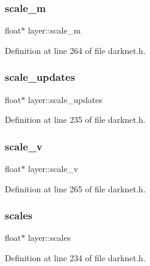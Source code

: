 \mbox{\label{structlayer_a858dcb301c88b816430a797dce3b95b6}} 
\subsubsection{\texorpdfstring{scale\_m}{scale\_m}}
{\footnotesize\ttfamily float$\ast$ layer\+::scale\+\_\+m}



Definition at line 264 of file darknet.\+h.

\mbox{\label{structlayer_afe8abd57f459714570b99b521cf9e159}} 
\subsubsection{\texorpdfstring{scale\_updates}{scale\_updates}}
{\footnotesize\ttfamily float$\ast$ layer\+::scale\+\_\+updates}



Definition at line 235 of file darknet.\+h.

\mbox{\label{structlayer_a881162ac744dcf116ec9c14c97fb1633}} 
\subsubsection{\texorpdfstring{scale\_v}{scale\_v}}
{\footnotesize\ttfamily float$\ast$ layer\+::scale\+\_\+v}



Definition at line 265 of file darknet.\+h.

\mbox{\label{structlayer_a82237cebb237c586f13f0a0ab35e38a3}} 
\subsubsection{\texorpdfstring{scales}{scales}}
{\footnotesize\ttfamily float$\ast$ layer\+::scales}



Definition at line 234 of file darknet.\+h.

